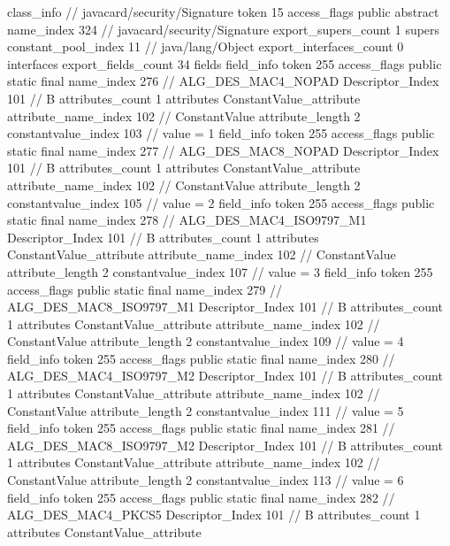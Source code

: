 {{		class_info {		// javacard/security/Signature
			token	15
			access_flags	public abstract
			name_index	324		// javacard/security/Signature
			export_supers_count	1
			supers {
				constant_pool_index	11		// java/lang/Object
			}
			export_interfaces_count	0
			interfaces {
			}
			export_fields_count	34
			fields {
			field_info {
				token	255
				access_flags	public static final
				name_index	276		// ALG_DES_MAC4_NOPAD
				Descriptor_Index	101		// B
				attributes_count	1
				attributes {
				ConstantValue_attribute {
					attribute_name_index	102		// ConstantValue
					attribute_length	2
					constantvalue_index	103		// value = 1
				}
				}
			}
			field_info {
				token	255
				access_flags	public static final
				name_index	277		// ALG_DES_MAC8_NOPAD
				Descriptor_Index	101		// B
				attributes_count	1
				attributes {
				ConstantValue_attribute {
					attribute_name_index	102		// ConstantValue
					attribute_length	2
					constantvalue_index	105		// value = 2
				}
				}
			}
			field_info {
				token	255
				access_flags	public static final
				name_index	278		// ALG_DES_MAC4_ISO9797_M1
				Descriptor_Index	101		// B
				attributes_count	1
				attributes {
				ConstantValue_attribute {
					attribute_name_index	102		// ConstantValue
					attribute_length	2
					constantvalue_index	107		// value = 3
				}
				}
			}
			field_info {
				token	255
				access_flags	public static final
				name_index	279		// ALG_DES_MAC8_ISO9797_M1
				Descriptor_Index	101		// B
				attributes_count	1
				attributes {
				ConstantValue_attribute {
					attribute_name_index	102		// ConstantValue
					attribute_length	2
					constantvalue_index	109		// value = 4
				}
				}
			}
			field_info {
				token	255
				access_flags	public static final
				name_index	280		// ALG_DES_MAC4_ISO9797_M2
				Descriptor_Index	101		// B
				attributes_count	1
				attributes {
				ConstantValue_attribute {
					attribute_name_index	102		// ConstantValue
					attribute_length	2
					constantvalue_index	111		// value = 5
				}
				}
			}
			field_info {
				token	255
				access_flags	public static final
				name_index	281		// ALG_DES_MAC8_ISO9797_M2
				Descriptor_Index	101		// B
				attributes_count	1
				attributes {
				ConstantValue_attribute {
					attribute_name_index	102		// ConstantValue
					attribute_length	2
					constantvalue_index	113		// value = 6
				}
				}
			}
			field_info {
				token	255
				access_flags	public static final
				name_index	282		// ALG_DES_MAC4_PKCS5
				Descriptor_Index	101		// B
				attributes_count	1
				attributes {
				ConstantValue_attribute {
}}}}}}}
